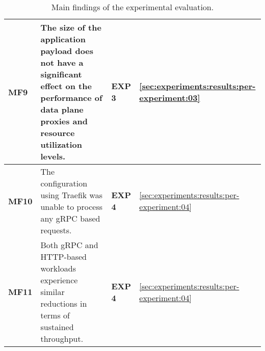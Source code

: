 \begin{table}[t]
\begin{tabularx}{\linewidth}{@{}lXll@{}}
\textbf{MF9} &
The size of the application payload does not have a significant effect on the performance of data plane proxies and resource utilization levels. &
\textbf{EXP 3} &
\cref{sec:experiments:results:per-experiment:03} \\
\midrule  
  
\textbf{MF10} &
The configuration using Traefik was unable to process any gRPC based requests. &
\textbf{EXP 4} &
\cref{sec:experiments:results:per-experiment:04} \\
\midrule  
  
\textbf{MF11} &
Both gRPC and HTTP-based workloads experience similar reductions in terms of sustained throughput. &
\textbf{EXP 4} &
\cref{sec:experiments:results:per-experiment:04} \\ 
  
\bottomrule
\end{tabularx}

\caption[Main findings of the experimental evaluation]{Main findings of the experimental evaluation.}
\label{tab:experiment:main-fidings}
\end{table}